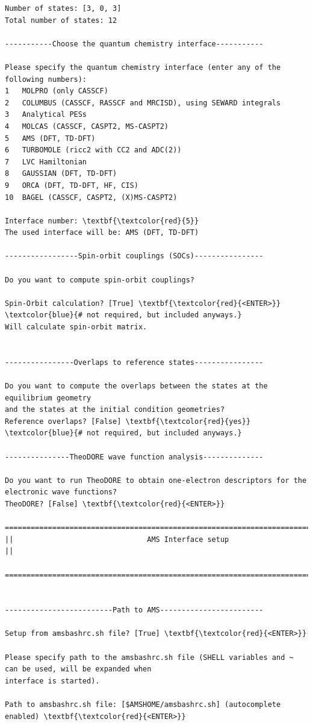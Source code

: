 \documentclass[a4paper,11pt,DIV=15,openany]{scrbook}
\begin{document}
\begin{oframed}
\begin{Verbatim}[commandchars=\\\{\}]
Number of states: [3, 0, 3]
Total number of states: 12

-----------Choose the quantum chemistry interface-----------

Please specify the quantum chemistry interface (enter any of the following numbers):
1	MOLPRO (only CASSCF)
2	COLUMBUS (CASSCF, RASSCF and MRCISD), using SEWARD integrals
3	Analytical PESs
4	MOLCAS (CASSCF, CASPT2, MS-CASPT2)
5	AMS (DFT, TD-DFT)
6	TURBOMOLE (ricc2 with CC2 and ADC(2))
7	LVC Hamiltonian
8	GAUSSIAN (DFT, TD-DFT)
9	ORCA (DFT, TD-DFT, HF, CIS)
10	BAGEL (CASSCF, CASPT2, (X)MS-CASPT2)

Interface number: \textbf{\textcolor{red}{5}}
The used interface will be: AMS (DFT, TD-DFT)

-----------------Spin-orbit couplings (SOCs)----------------

Do you want to compute spin-orbit couplings?

Spin-Orbit calculation? [True] \textbf{\textcolor{red}{<ENTER>}}     \textcolor{blue}{# not required, but included anyways.}
Will calculate spin-orbit matrix.


----------------Overlaps to reference states----------------

Do you want to compute the overlaps between the states at the equilibrium geometry 
and the states at the initial condition geometries?
Reference overlaps? [False] \textbf{\textcolor{red}{yes}}    \textcolor{blue}{# not required, but included anyways.}

---------------TheoDORE wave function analysis--------------

Do you want to run TheoDORE to obtain one-electron descriptors for the electronic wave functions?
TheoDORE? [False] \textbf{\textcolor{red}{<ENTER>}} 

================================================================================
||                               AMS Interface setup                              ||
  ================================================================================


-------------------------Path to AMS------------------------

Setup from amsbashrc.sh file? [True] \textbf{\textcolor{red}{<ENTER>}}

Please specify path to the amsbashrc.sh file (SHELL variables and ~ can be used, will be expanded when 
interface is started).

Path to amsbashrc.sh file: [$AMSHOME/amsbashrc.sh] (autocomplete enabled) \textbf{\textcolor{red}{<ENTER>}} 


\end{Verbatim}
\end{oframed}
\end{document}
